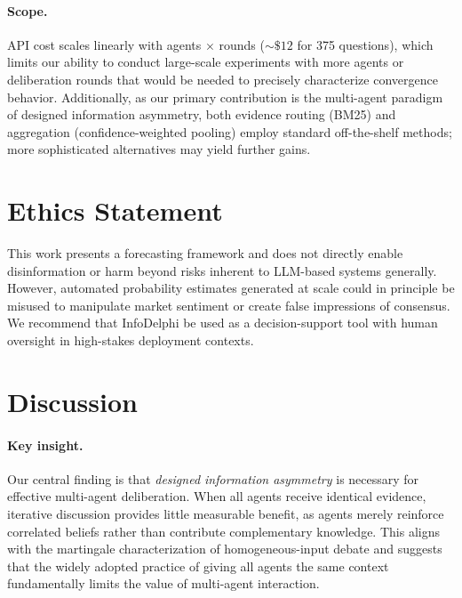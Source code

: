 \documentclass[11pt]{article}
\theoremstyle{plain}
\theoremstyle{definition}
\begin{document}

  \paragraph{Scope.}
  API cost scales linearly with agents $\times$ rounds (${\sim}\$12$ for 375 questions), which limits our ability to conduct large-scale experiments with more agents or deliberation rounds that would be needed to precisely characterize convergence behavior.
  Additionally, as our primary contribution is the multi-agent paradigm of designed information asymmetry, both evidence routing (BM25) and aggregation (confidence-weighted pooling) employ standard off-the-shelf methods; more sophisticated alternatives may yield further gains.

\section*{Ethics Statement}
  This work presents a forecasting framework and does not directly enable disinformation or harm beyond risks inherent to LLM-based systems generally. However, automated probability estimates generated at scale could in principle be misused to manipulate market sentiment or create false impressions of consensus. We recommend that InfoDelphi be used as a decision-support tool with human oversight in high-stakes deployment contexts.


\appendix

\section{Discussion}
\paragraph{Key insight.}
Our central finding is that \textit{designed information asymmetry} is necessary for effective multi-agent deliberation.
When all agents receive identical evidence, iterative discussion provides little measurable benefit, as agents merely reinforce correlated beliefs rather than contribute complementary knowledge.
This aligns with the martingale characterization of homogeneous-input debate and suggests that the widely adopted practice of giving all agents the same context fundamentally limits the value of multi-agent interaction.
\end{document}
